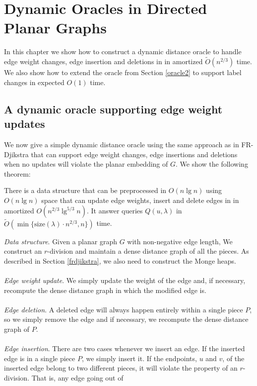 \section{Dynamic Oracles in Directed Planar Graphs}\label{dynamicPlanar}
In this chapter we show how to construct a dynamic distance oracle to handle
edge weight changes, edge insertion and deletions in in amortized $\tilde{O}(n^{2/3})$
time. We also show how to extend the oracle from Section
\ref{oracle2} to support label changes in expected $O(1)$ time.

\subsection{A dynamic oracle supporting edge weight updates}\label{oracle3}
We now give a simple dynamic distance oracle using the same approach as in FR-Djikstra that can support edge weight changes, edge
insertions and deletions when no updates will violate the planar embedding of $G$. We
show the following theorem:
\begin{thm}\label{thm4}
  There is a data structure that can be preprocessed in $O(n\lg n)$ using $O(n\lg n)$
  space that can update edge weights, insert and delete edges in in amortized
  $O(n^{2/3}\lg^{5/3} n)$. It answer queries $Q(u,\lambda)$ in
  $\tilde{O}(\min\{\text{size}(\lambda)\cdot n^{2/3}, n\})$ time.
\end{thm}
\indent \textit{Data structure}.
Given a planar graph $G$ with non-negative edge length, We construct an $r$-division and maintain a dense distance graph of all the pieces. As
described in Section \ref{frdjikstra}, we also need to construct the Monge heaps. \\
\\
\indent \textit{Edge weight update}.
We simply update the weight of the edge and, if necessary, recompute the dense distance graph in which
the modified edge is. \\
\\
\indent \textit{Edge deletion}.
A deleted edge will always happen entirely within a single piece $P$, so we simply remove
the edge and if necessary, we recompute the dense distance graph of $P$. \\
\\
\indent \textit{Edge insertion}.
There are two cases whenever we insert an edge. If the inserted edge is in a single piece
$P$, we simply insert it. If the endpoints, $u$ and $v$, of the inserted edge belong to two different
pieces, it will violate the property of an $r$-division. That is, any edge going out of
